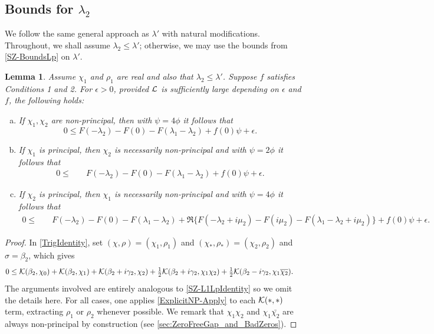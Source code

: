 \documentclass[12pt,psamsfonts]{amsart}
\newtheorem{lem}[thm]{Lemma}
\theoremstyle{definition}
\theoremstyle{remark}
\numberwithin{equation}{section}
\begin{document}
\subsection{Bounds for $\lambda_2$} 
\label{SZ-BoundsL2}
We follow the same general approach as $\lambda'$ with natural modifications. Throughout, we shall assume $\lambda_2 \leq \lambda'$; otherwise, we may use the bounds from \cref{SZ-BoundsLp} on $\lambda'$. 
\begin{lem} \label{SZ-L1L2Identity} Assume $\chi_1$ and $\rho_1$ are real and also that $\lambda_2 \leq \lambda'$. Suppose $f$ satisfies Conditions 1 and 2. For $\epsilon > 0$, provided $\mathcal{L}$ is sufficiently large depending on $\epsilon$ and $f$,  the following holds: 

\begin{enumerate}[(a)]
	\item If $\chi_1,\chi_2$ are non-principal, then with $\psi = 4\phi$ it follows that
\[
0 \leq F(-\lambda_2) - F(0) - F(\lambda_1-\lambda_2) + f(0)\psi+\epsilon.
\]
	\item If $\chi_1$ is principal, then $\chi_2$ is necessarily non-principal and with $\psi = 2\phi$ it follows that
	\begin{align*}
0 \leq & \quad F(-\lambda_2)  - F(0) - F(\lambda_1-\lambda_2) + f(0)\psi+\epsilon.
\end{align*}

	\item If $\chi_2$ is principal, then $\chi_1$ is necessarily non-principal and with $\psi = 4\phi$ it follows that
	\	\begin{align*}
0 \leq & \quad F(-\lambda_2)  - F(0) - F(\lambda_1-\lambda_2)  + \Re\{ F(-\lambda_2 + i\mu_2) - F(i\mu_2) - F(\lambda_1-\lambda_2+i\mu_2)  \} + f(0)\psi + \epsilon.
\end{align*}
\end{enumerate}
\end{lem}
\begin{proof} In \eqref{TrigIdentity}, set $(\chi, \rho) = (\chi_1, \rho_1)$ and $(\chi_*, \rho_*)  = (\chi_2, \rho_2)$ and $\sigma = \beta_2$, which gives
\begin{equation}
\begin{aligned}
0 & \leq \mathcal{K}(\beta_2, \chi_0)  + \mathcal{K}(\beta_2, \chi_1) + \mathcal{K}(\beta_2 + i\gamma_2, \chi_2) + \tfrac{1}{2} \mathcal{K}(\beta_2+ i\gamma_2, \chi_1\chi_2) + \tfrac{1}{2}\mathcal{K}(\beta_2- i\gamma_2, \chi_1\overline{\chi_2}).
\end{aligned}
\label{TI-SZ-L2}
\end{equation}
The arguments involved are entirely analogous to \cref{SZ-L1LpIdentity} so we omit the details here. For all cases, one applies \cref{ExplicitNP-Apply} to each $\mathcal{K}(\ast, \ast)$ term, extracting $\rho_1$ or $\rho_2$ whenever possible. We remark that $\chi_1\chi_2$ and $\chi_1\bar{\chi_2}$ are always non-principal by construction (see \cref{sec:ZeroFreeGap_and_BadZeros}).
\end{proof}
\end{document}
